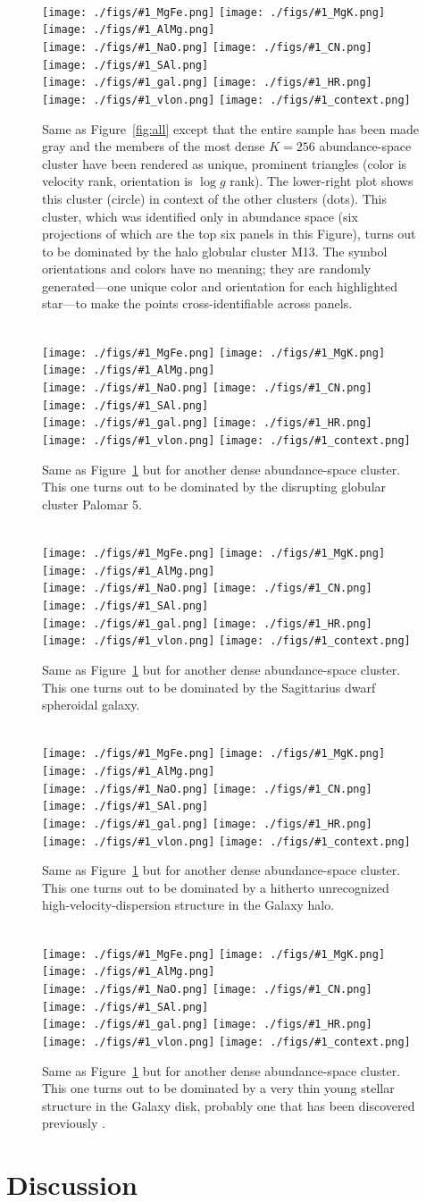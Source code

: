 \documentclass[manuscript, letterpaper]{aastex6}
\renewcommand{\figurename}{Figure} %
\newcommand{\logg}{\log g}
\newcommand{\insanefigure}[1]{\rule{0ex}{\headsep}\\%
\texttt{[image: ./figs/\#1\_MgFe.png]}%
\texttt{[image: ./figs/\#1\_MgK.png]}%
\texttt{[image: ./figs/\#1\_AlMg.png]}\\
\texttt{[image: ./figs/\#1\_NaO.png]}%
\texttt{[image: ./figs/\#1\_CN.png]}%
\texttt{[image: ./figs/\#1\_SAl.png]}\\
\texttt{[image: ./figs/\#1\_gal.png]}%
\texttt{[image: ./figs/\#1\_HR.png]}\\
\texttt{[image: ./figs/\#1\_vlon.png]}%
\texttt{[image: ./figs/\#1\_context.png]}}
\begin{document}
\begin{figure}[!p]
\insanefigure{cluster_0256_0253}
\caption{Same as \figurename~\ref{fig:all} except that the entire
  sample has been made gray and the members of the most dense $K=256$
  abundance-space cluster have been rendered as unique, prominent
  triangles (color is velocity rank, orientation is $\logg$ rank).
  The lower-right plot shows this cluster (circle) in context of the
  other clusters (dots).  This cluster, which was identified only in
  abundance space (six projections of which are the top six panels in
  this \figurename), turns out to be dominated by the halo globular
  cluster M13. The symbol orientations and colors have no meaning;
  they are randomly generated---one unique color and orientation for
  each highlighted star---to make the points cross-identifiable across
  panels.\label{fig:M13}}
\end{figure}
\begin{figure}[!p]
\insanefigure{cluster_0256_0034}
\caption{Same as \figurename~\ref{fig:M13} but for another dense
  abundance-space cluster.
  This one turns out to be dominated by the disrupting globular
  cluster Palomar 5.\label{fig:Pal5}}
\end{figure}
\begin{figure}[!p]
\insanefigure{cluster_0256_0177}
\caption{Same as \figurename~\ref{fig:M13} but for another dense
  abundance-space cluster.
  This one turns out to be dominated by the Sagittarius dwarf spheroidal galaxy.\label{fig:Sgr}}
\end{figure}
\begin{figure}[!p]
\insanefigure{cluster_0256_0010}
\caption{Same as \figurename~\ref{fig:M13} but for another dense
  abundance-space cluster.
  This one turns out to be dominated by a hitherto unrecognized high-velocity-dispersion
  structure in the Galaxy halo.\label{fig:halo}}
\end{figure}
\begin{figure}[!p]
\insanefigure{cluster_0256_0141}
\caption{Same as \figurename~\ref{fig:M13} but for another dense
  abundance-space cluster.
  This one turns out to be dominated by a very thin young stellar
  structure in the Galaxy disk, probably one that has been discovered previously \citep{wegg}.\label{fig:disk}}
\end{figure}

\clearpage
\section{Discussion}\label{sec:discussion}
\end{document}
